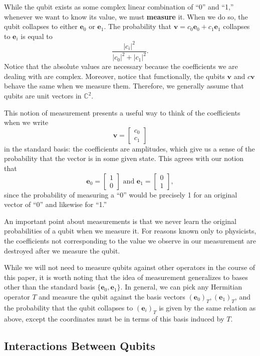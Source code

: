\documentclass[a4paper]{article}
\newcommand\0{\mathbf{0}}
\newcommand\ee{\mathbf{e}}
\newcommand\vv{\mathbf{v}}
\newcommand\CC{\mathbb{C}}
\newcommand\<{\langle}
\renewcommand\>{\rangle}
\begin{document}
While the qubit exists as some complex linear combination of ``0'' and ``1,'' whenever we want to know its value, we must \textbf{measure} it. When we do so, the qubit collapses to either $\ee_0$ or $\ee_1$. The probability that $\vv = c_0\ee_0+c_1\ee_1$ collapses to $\ee_i$ is equal to $$\frac{|c_i|^2}{|c_0|^2+|c_1|^2}.$$
Notice that the absolute values are necessary because the coefficients we are dealing with are complex. Moreover, notice that functionally, the qubits $\vv$ and $c\vv$ behave the same when we measure them. Therefore, we generally assume that qubits are unit vectors in $\CC^2$. 

This notion of measurement presents a useful way to think of the coefficients  when we write  $$\vv=\begin{bmatrix}c_0\\c_1\end{bmatrix}$$ in the standard basis: the coefficients are amplitudes, which give us a  sense of the probability that the vector is in some given state. This agrees with our notion that $$\ee_0 =\begin{bmatrix}1 \\ 0\end{bmatrix} \text{ and } \ee_1 =\begin{bmatrix}0\\ 1\end{bmatrix},$$ since the probability of measuring a ``0'' would be precisely 1 for an original vector of ``0'' and likewise for ``1.''

An important point about measurements is that we never  learn the original probabilities of a qubit when we measure it. For reasons known only to physicists, the coefficients not corresponding to the value we observe in our measurement are destroyed after we measure the qubit.

While we will not need to measure qubits against other operators in the course of this paper, it is worth noting that the idea of measurement generalizes to bases other than the standard basis $\{\ee_0,\ee_1\}$. In general, we can pick any Hermitian operator $T$ and measure the qubit against the basis vectors $(\ee_0)_T, (\ee_1)_T$, and the probability that the qubit collapses to $(\ee_i)_T$ is given by the same relation as above, except the coordinates must be in terms of this basis induced by $T$. 

\subsection{Interactions Between Qubits}
\end{document}
